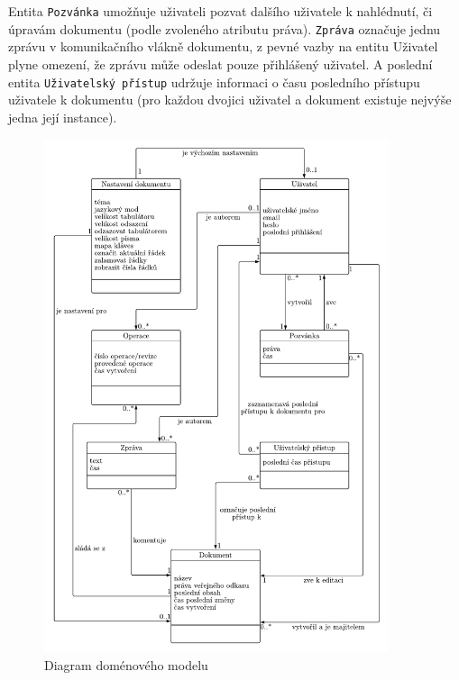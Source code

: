 Entita \texttt{Pozvánka} umožňuje uživateli pozvat dalšího uživatele k nahlédnutí, či úpravám dokumentu (podle zvoleného atributu práva).
\texttt{Zpráva} označuje jednu zprávu v komunikačního vlákně dokumentu, z pevné vazby na entitu Uživatel plyne omezení, že zprávu může odeslat pouze přihlášený uživatel.
A poslední entita \texttt{Uživatelský přístup} udržuje informaci o času posledního přístupu uživatele k dokumentu (pro každou dvojici uživatel a dokument existuje nejvýše jedna její instance).

\begin{figure}[ht!]
    \centering
    \includegraphics[width=0.9\textwidth]{partials/analyza/domenovy_model-2.pdf}
    \caption{Diagram doménového modelu}\label{fig:domenovy_model}
\end{figure}